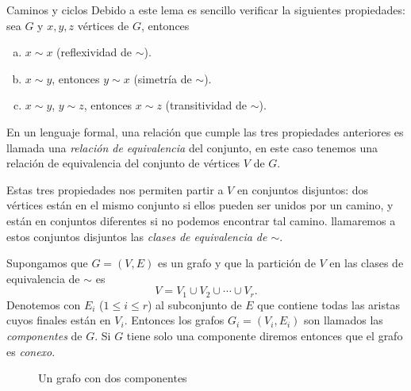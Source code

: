 \begin{section}{Caminos y ciclos}
Debido a este lema es sencillo verificar la siguientes propiedades: sea $G$ y $x,y,z$ vértices de $G$, entonces
\begin{enumerate}[a)]
\item $x \sim x$ (reflexividad de $\sim$).
\item $x \sim y$, entonces $y \sim x$ (simetría de $\sim$).
\item $x \sim y$,  $y \sim z$, entonces  $x \sim z$ (transitividad  de $\sim$).
\end{enumerate}


En un lenguaje formal, una relación que  cumple las tres propiedades anteriores es llamada una  {\em relación de equivalencia} del conjunto, en este caso tenemos una relación de equivalencia del conjunto de vértices $V$ de $G$. 

Estas tres propiedades nos permiten partir a $V$ en conjuntos disjuntos: dos vértices están en el mismo conjunto si ellos pueden
ser unidos por un camino, y están en conjuntos diferentes si no podemos encontrar tal camino. llamaremos a estos conjuntos disjuntos las {\em clases de equivalencia de $\sim$}.

\begin{definicion}Supongamos que $G=(V,E)$ es un grafo y
que la partición de $V$ en las clases de equivalencia de $\sim$ es
$$
V= V_1 \cup V_2 \cup \cdots \cup V_r.
$$
Denotemos con $E_i$ ($1\le i \le r$) al subconjunto de $E$ que
contiene todas las aristas cuyos finales están en $V_i$. Entonces
los grafos $G_i=(V_i,E_i)$ son llamados las {\em componentes}    
de $G$. Si $G$ tiene solo una componente diremos entonces que el grafo es {\em conexo}.
\end{definicion}



\begin{figure}[t]
	\begin{center}
\end{center}
\caption{Un grafo con dos componentes} \label{f5.6}
\end{figure}


\end{section}

